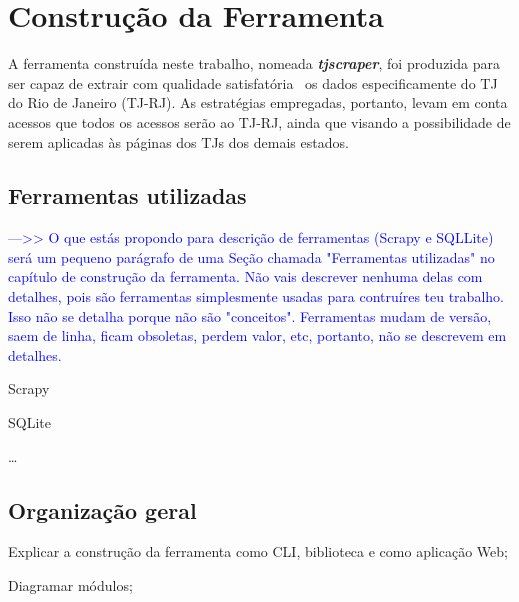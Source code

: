 \chapter{Construção da Ferramenta~\label{chp:construção-da-ferramenta}}

A ferramenta construída neste trabalho, nomeada \textit{\textbf{tjscraper}},
foi produzida para ser capaz de extrair com qualidade
satisfatória~ os dados especificamente do TJ do Rio de Janeiro
(TJ-RJ). As estratégias empregadas, portanto, levam em conta acessos que todos
os acessos serão ao TJ-RJ, ainda que visando a possibilidade de serem aplicadas
às páginas dos TJs dos demais estados.

\section{Ferramentas utilizadas~\label{section:ferramentas-utilizadas}}

\textcolor{blue}{--->> O que estás propondo para descrição de ferramentas
(Scrapy e SQLLite) será um pequeno parágrafo de uma Seção chamada "Ferramentas
utilizadas" no capítulo de construção da ferramenta. Não vais descrever nenhuma
delas com detalhes, pois são ferramentas simplesmente usadas para contruíres
teu trabalho. Isso não se detalha porque não são "conceitos". Ferramentas mudam
de versão, saem de linha, ficam obsoletas, perdem valor, etc, portanto, não se
descrevem em detalhes.}

\begin{todolist}
    \item Scrapy
    \item SQLite
    \item \ldots
\end{todolist}

\section{Organização geral}

\begin{todolist}
    \item Explicar a construção da ferramenta como CLI, biblioteca e como
          aplicação Web;
    \item Diagramar módulos;
\end{todolist}

